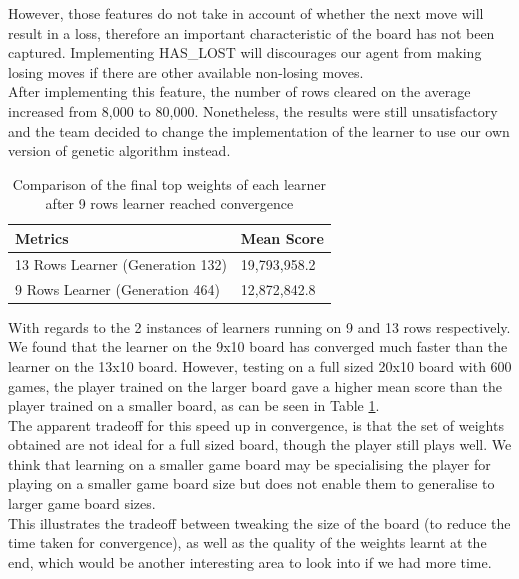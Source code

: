 \documentclass[a4paper,12pt,twocolumn]{article}
\begin{document}
However, those features do not take in account of whether the next move will result
in a loss, therefore an important characteristic of the board has not been captured.
Implementing HAS\_LOST will discourages our agent from making losing moves if
there are other available non-losing moves.\\

After implementing this feature, the number of rows cleared on the average increased
from 8,000 to 80,000. Nonetheless, the results were still unsatisfactory and the team
decided to change the implementation of the learner to use our own version of genetic
algorithm instead.\\

\begin{table}[h]
	\centering
	\begin{tabular}{|l|l|}
		\hline
		\textbf{Metrics}                 & \textbf{Mean Score} \\
		\hline
		13 Rows Learner (Generation 132) & 19,793,958.2        \\
		\hline
		9 Rows Learner (Generation 464)  & 12,872,842.8        \\
		\hline
	\end{tabular}
	\caption{
		Comparison of the final top weights of each learner after 9 rows learner
		reached convergence
	}
	\label{learner_comparison}
\end{table}

With regards to the 2 instances of learners running on 9 and 13 rows respectively.
We found that the learner on the 9x10 board has converged much faster than the
learner on the 13x10 board. However, testing on a full sized 20x10 board with 600 games,
the player trained on the larger board gave a higher mean score than the player
trained on a smaller board, as can be seen in Table \ref{learner_comparison}.\\

The apparent tradeoff for this speed up in convergence, is that the set of weights
obtained are not ideal for a full sized board, though the player still plays well.
We think that learning on a smaller game board may be specialising the player for playing on
a smaller game board size but does not enable them to generalise to larger game board sizes.\\

This illustrates the tradeoff between tweaking the size of the board (to
reduce the time taken for convergence), as well as the quality of the weights
learnt at the end, which would be another interesting area to look into if we had
more time.
\end{document}
